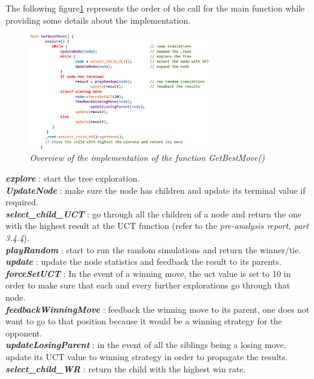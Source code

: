 The following figure\ref{fig:MCTSAlgorithm} represents the order of the call for the main function while providing some details about the implementation.
\begin{figure}[H]
\centerline{\includegraphics[width=0.7\textwidth]{Base_Algorithm/Img/Algorithm.png}}
\caption{\label{fig:MCTSAlgorithm}\textit{Overview of the implementation of the function GetBestMove()}}
\end{figure}
\noindent
\textit{\textbf{explore}} : start the tree exploration.
\medskip\\
\textit{\textbf{UpdateNode}} : make sure the node has children and update its terminal value if required.
\medskip\\
\textit{\textbf{select\_child\_UCT}} : go through all the children of a node and return the one with the highest result at the UCT function (refer to the \textit{pre-analysis report, part 3.4.4}).
\medskip\\
\textit{\textbf{playRandom}} : start to run the random simulations and return the winner/tie.
\medskip\\
\textit{\textbf{update}} : update the node statistics and feedback the result to its parents.
\medskip\\
\textit{\textbf{forceSetUCT}} : In the event of a winning move, the uct value is set to 10 in order to make sure that each and every further explorations go through that node.
\medskip\\
\textit{\textbf{feedbackWinningMove}} : feedback the winning move to its parent, one does not want to go to that position because it would be a winning strategy for the opponent.
\medskip\\
\textit{\textbf{updateLosingParent}} : in the event of all the siblings being a losing move, update its UCT value to winning strategy in order to propagate the results.
\medskip\\
\textit{\textbf{select\_child\_WR}} : return the child with the highest win rate.\\

